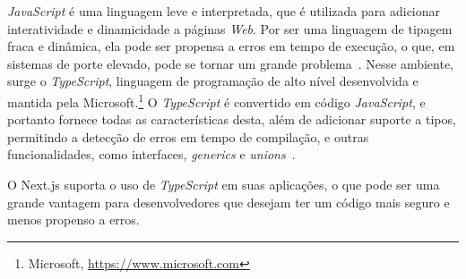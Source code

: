 \textit{JavaScript} é uma linguagem leve e interpretada, que é utilizada para adicionar interatividade e dinamicidade
a páginas \textit{Web}. Por ser uma linguagem de tipagem fraca e dinâmica, ela pode ser propensa a erros
em tempo de execução, o que, em sistemas de porte elevado, pode se tornar um grande problema~\cite{typescript:2024}.
Nesse ambiente, surge o \textit{TypeScript}, linguagem de programação de alto nível desenvolvida e mantida pela Microsoft.\footnote{Microsoft, \url{https://www.microsoft.com}}
O \textit{TypeScript} é convertido em código \textit{JavaScript}, e portanto fornece todas as características desta, além de adicionar suporte a tipos, 
permitindo a detecção de erros em tempo de compilação,
e outras funcionalidades, como interfaces, \textit{generics} e \textit{unions}~\cite{typescript:2024}.

O Next.js suporta o uso de \textit{TypeScript} em suas aplicações, o que pode ser uma grande vantagem para
desenvolvedores que desejam ter um código mais seguro e menos propenso a erros.
